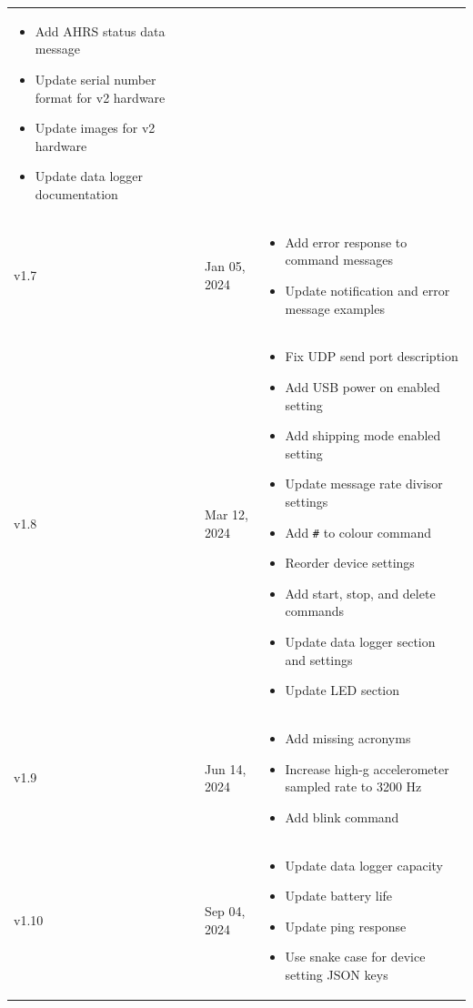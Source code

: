 \begin{longtable}{| >{\centering}p{} | p{} | >{\raggedright\arraybackslash}p{} |}
\begin{itemize}
        \item Add \ac{AHRS} status data message
        \item Update serial number format for v2 hardware
        \item Update images for v2 hardware
        \item Update data logger documentation
    \end{itemize}\\
    v1.7 & Jan 05, 2024 &
    \begin{itemize}
        \item Add error response to command messages
        \item Update notification and error message examples
    \end{itemize}\\
    v1.8 & Mar 12, 2024 &
    \begin{itemize}
        \item Fix \ac{UDP} send port description
        \item Add \ac{USB} power on enabled setting
        \item Add shipping mode enabled setting
        \item Update message rate divisor settings
        \item Add \texttt{\#} to colour command
        \item Reorder device settings
        \item Add start, stop, and delete commands
        \item Update data logger section and settings
        \item Update \ac{LED} section
    \end{itemize}\\
    v1.9 & Jun 14, 2024 &
    \begin{itemize}
        \item Add missing acronyms
        \item Increase high-g accelerometer sampled rate to 3200 Hz
        \item Add blink command
    \end{itemize}\\
    v1.10 & Sep 04, 2024 &
    \begin{itemize}
        \item Update data logger capacity
        \item Update battery life
        \item Update ping response
        \item Use snake case for device setting \ac{JSON} keys

\end{itemize}
\end{longtable}
